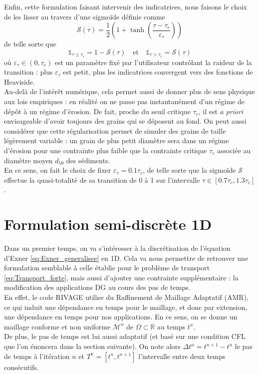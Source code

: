\documentclass[11pt, a4paper, oneside]{report}
\begin{document}
Enfin, cette formulation faisant intervenir des indicatrices, nous faisons le choix de les lisser au travers d'une sigmoïde définie comme
\begin{equation}
    \mathcal{S}(\tau) = \frac{1}{2} \left( 1 + \tanh \left( \frac{\tau - \tau_c}{\varepsilon_\tau} \right) \right)
\end{equation}
de telle sorte que
\begin{equation}
    \mathds{1}_{\tau \leq \tau_c} = 1 - \mathcal{S}(\tau) \quad \text{et} \quad \mathds{1}_{\tau > \tau_c} = \mathcal{S}(\tau)
\end{equation}
où $\varepsilon_\tau \in (0, \tau_c)$ est un paramètre fixé par l'utilisateur contrôlant la raideur de la transition : plus $\varepsilon_\tau$ est petit, plus les indicatrices convergent vers des fonctions de Heaviside. \\
Au-delà de l'intérêt numérique, cela permet aussi de donner plus de sens physique aux lois empiriques : en réalité on ne passe pas instantanément d'un régime de dépôt à un régime d'érosion. De fait, proche du seuil critique $\tau_c$, il est \textit{a priori} envisageable d'avoir toujours des grains qui se déposent au fond. On peut aussi considérer que cette régularisation permet de simuler des grains de taille légèrement variable : un grain de plus petit diamètre sera dans un régime d'érosion pour une contrainte plus faible que la contrainte critique $\tau_c$ associée au diamètre moyen $d_{50}$ des sédiments. \\
En ce sens, on fait le choix de fixer $\varepsilon_\tau = 0.1 \tau_c$, de telle sorte que la sigmoïde $\mathcal{S}$ effectue la quasi-totalité de sa transition de 0 à 1 sur l'intervalle $\tau \in [0.7 \tau_c, 1.3 \tau_c]$.

\section{Formulation semi-discrète 1D}

Dans un premier temps, on va s'intéresser à la discrétisation de l'équation d'Exner \eqref{eq:Exner_generalisee} en 1D. Cela va nous permettre de retrouver une formulation semblable à celle établie pour le problème de transport \eqref{eq:Transport_forte}, mais aussi d'ajouter une contrainte supplémentaire : la modification des applications DG au cours des pas de temps. \\
En effet, le code RIVAGE utilise du Raffinement de Maillage Adaptatif (AMR), ce qui induit une dépendance en temps pour le maillage, et donc par extension, une dépendance en temps pour nos applications. En ce sens, on se donne un maillage conforme et non uniforme $\mathcal{M}^n$ de $\Omega \subset \mathbb{R}$ au temps $t^n$. \\
De plus, le pas de temps est lui aussi adaptatif (et basé sur une condition CFL que l'on énoncera dans la section suivante). On note alors $\Delta t^n = t^{n+1} - t^n$ le pas de temps à l'itération $n$ et $T^n = [t^n, t^{n+1}]$ l'intervalle entre deux temps consécutifs. \\
\end{document}
